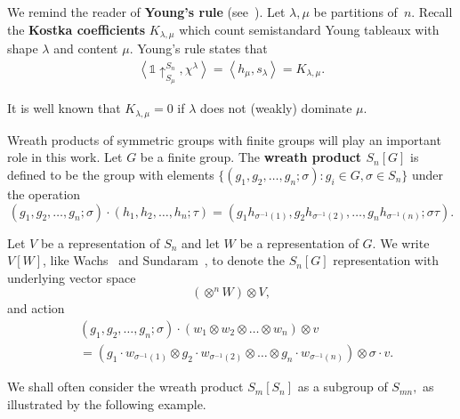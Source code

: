\documentclass[ALCO, Unicode]{cedram}
\begin{document}
We remind the reader of \textbf{Young's rule} (see~\cite[\S 2.11]{sagan2013symmetric}). Let $\lambda, \mu$ be partitions of~$n$. Recall the \textbf{Kostka coefficients} $K_{\lambda, \mu}$ which count semistandard Young tableaux with shape $\lambda$ and content $\mu.$ Young's rule states that
\begin{align} \label{eqn:Young's-rule}
    \left \langle \mathbb{1} \uparrow_{S_\mu}^{S_n}, \chi^\lambda\right \rangle = \left \langle h_\mu, s_\lambda\right \rangle = K_{\lambda, \mu}.
\end{align}

It is well known that $K_{\lambda, \mu} = 0$ if $\lambda$ does not (weakly) dominate $\mu.$

Wreath products of symmetric groups with finite groups will play an important role in this work. Let $G$ be a finite group. The \textbf{wreath product $S_n[G]$} is defined to be the group with elements $\{(g_1, g_2, \ldots, g_n; \sigma): g_i \in G, \sigma \in S_n\}$ under the operation \[(g_1, g_2, \ldots, g_n; \sigma)\cdot(h_1, h_2, \ldots, h_n; \tau) = (g_1h_{\sigma^{-1}(1)}, g_2h_{\sigma^{-1}(2)}, \ldots, g_n h_{\sigma^{-1}(n)}; \sigma \tau).\]

Let $V$ be a representation of $S_n$ and let $W$ be a representation of $G$. We write \textbf{$V[W]$}, like Wachs~\cite{WachsPosetTopology} and Sundaram~\cite{SundaramAdvances}, to denote the $S_n[G]$ representation with underlying vector space \[\left (\otimes ^n W \right) \otimes V,\] and action 
\[
\begin{aligned}
&(g_1, g_2, \ldots, g_n; \sigma) \cdot (w_1 \otimes w_2 \otimes \ldots \otimes w_n) \otimes v \\
&= \left(g_1 \cdot w_{\sigma^{-1}(1)}\otimes g_2 \cdot w_{\sigma^{-1}(2)} \otimes \ldots \otimes g_n \cdot w_{\sigma^{-1}(n)}\right)\otimes \sigma \cdot v.
\end{aligned}
\] 

We shall often consider the wreath product $S_m[S_n]$ as a subgroup of $S_{mn},$ as illustrated by the following example. 
\end{document}
